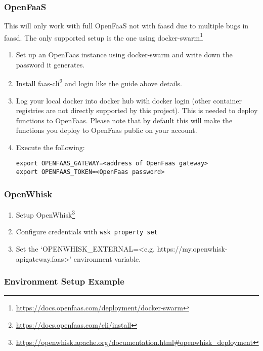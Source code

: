 \documentclass[../main.tex]{subfiles}
\begin{document}
\subsubsection{OpenFaaS}\label{sec:providersetupopenfaas}
This will only work with full OpenFaaS not with faasd due to multiple bugs in faasd.
The only supported setup is the one using docker-swarm\footnote{\url{https://docs.openfaas.com/deployment/docker-swarm}}
\begin{enumerate}
\item Set up an OpenFaas instance using docker-swarm and write down the password it generates.
\item Install faas-cli\footnote{\url{https://docs.openfaas.com/cli/install}} and login like the guide above details.
\item Log your local docker into docker hub with docker login (other container registries are not directly supported by this project).
This is needed to deploy functions to OpenFaas. Please note that by default this will make the functions you deploy to OpenFaas public on your account.
\item Execute the following: 
  \begin{tcolorbox}
    \texttt{export OPENFAAS\_GATEWAY=<address of OpenFaas gateway>}\\
    \texttt{export OPENFAAS\_TOKEN=<OpenFaas password>}\\
  \end{tcolorbox}
\end{enumerate}

\subsubsection{OpenWhisk}\label{sec:providersetupopenwhisk}

\begin{enumerate}
\item Setup OpenWhisk\footnote{\url{https://openwhisk.apache.org/documentation.html\#openwhisk\_deployment}}
\item Configure credentials with \texttt{wsk property set}
\item Set the `OPENWHISK\_EXTERNAL=<e.g. https://my.openwhisk-apigateway.faas>' environment variable.
\end{enumerate}

\subsubsection{Environment Setup Example}\label{sec:providersetupenv}
\end{document}
